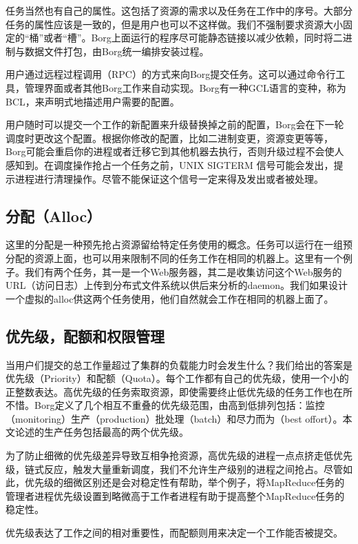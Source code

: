 任务当然也有自己的属性。这包括了资源的需求以及任务在工作中的序号。大部分任务的属性应该是一致的，但是用户也可以不这样做。我们不强制要求资源大小固定的“桶”或者“槽”。Borg上面运行的程序尽可能静态链接以减少依赖，同时将二进制与数据文件打包，由Borg统一编排安装过程。

用户通过远程过程调用（RPC）的方式来向Borg提交任务。这可以通过命令行工具，管理界面或者其他Borg工作来自动实现。Borg有一种GCL语言的变种，称为BCL，来声明式地描述用户需要的配置。

用户随时可以提交一个工作的新配置来升级替换掉之前的配置，Borg会在下一轮调度时更改这个配置。根据你修改的配置，比如二进制变更，资源变更等等，Borg可能会重启你的进程或者迁移它到其他机器去执行，否则升级过程不会使人感知到。在调度操作抢占一个任务之前，UNIX SIGTERM 信号可能会发出，提示进程进行清理操作。尽管不能保证这个信号一定来得及发出或者被处理。

\subsection{分配（Alloc）}

这里的分配是一种预先抢占资源留给特定任务使用的概念。任务可以运行在一组预分配的资源上面，也可以用来限制不同的任务工作在相同的机器上。这里有一个例子。我们有两个任务，其一是一个Web服务器，其二是收集访问这个Web服务的URL（访问日志）上传到分布式文件系统以供后来分析的daemon。我们如果设计一个虚拟的alloc供这两个任务使用，他们自然就会工作在相同的机器上面了。

\subsection{优先级，配额和权限管理}

当用户们提交的总工作量超过了集群的负载能力时会发生什么？我们给出的答案是优先级（Priority）和配额（Quota）。每个工作都有自己的优先级，使用一个小的正整数表达。高优先级的任务索取资源，即使需要终止低优先级的任务工作也在所不惜。Borg定义了几个相互不重叠的优先级范围，由高到低排列包括：监控（monitoring）生产（production）批处理（batch）和尽力而为（best offort）。本文论述的生产任务包括最高的两个优先级。

为了防止细微的优先级差异导致互相争抢资源，高优先级的进程一点点挤走低优先级，链式反应，触发大量重新调度，我们不允许生产级别的进程之间抢占。尽管如此，优先级的细微区别还是会对稳定性有帮助，举个例子，将MapReduce任务的管理者进程优先级设置到略微高于工作者进程有助于提高整个MapReduce任务的稳定性。

优先级表达了工作之间的相对重要性，而配额则用来决定一个工作能否被提交。

